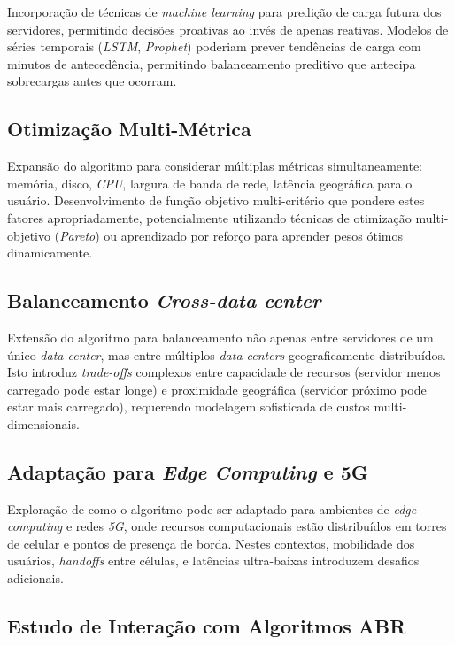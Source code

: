 Incorporação de técnicas de \textit{machine learning} para predição de carga futura dos servidores, permitindo decisões proativas ao invés de apenas reativas. Modelos de séries temporais (\textit{LSTM}, \textit{Prophet}) poderiam prever tendências de carga com minutos de antecedência, permitindo balanceamento preditivo que antecipa sobrecargas antes que ocorram.

\subsection{Otimização Multi-Métrica}

Expansão do algoritmo para considerar múltiplas métricas simultaneamente: memória, disco, \textit{CPU}, largura de banda de rede, latência geográfica para o usuário. Desenvolvimento de função objetivo multi-critério que pondere estes fatores apropriadamente, potencialmente utilizando técnicas de otimização multi-objetivo (\textit{Pareto}) ou aprendizado por reforço para aprender pesos ótimos dinamicamente.

\subsection{Balanceamento \textit{Cross-data center}}

Extensão do algoritmo para balanceamento não apenas entre servidores de um único \textit{data center}, mas entre múltiplos \textit{data centers} geograficamente distribuídos. Isto introduz \textit{trade-offs} complexos entre capacidade de recursos (servidor menos carregado pode estar longe) e proximidade geográfica (servidor próximo pode estar mais carregado), requerendo modelagem sofisticada de custos multi-dimensionais.

\subsection{Adaptação para \textit{Edge Computing} e 5G}

Exploração de como o algoritmo pode ser adaptado para ambientes de \textit{edge computing} e redes \textit{5G}, onde recursos computacionais estão distribuídos em torres de celular e pontos de presença de borda. Nestes contextos, mobilidade dos usuários, \textit{handoffs} entre células, e latências ultra-baixas introduzem desafios adicionais.

\subsection{Estudo de Interação com Algoritmos ABR}

